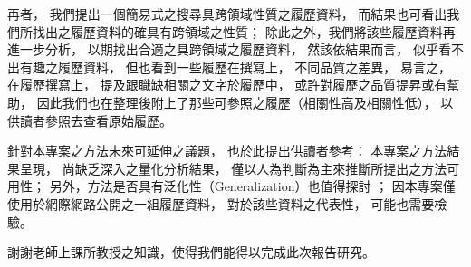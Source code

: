 \documentclass[sigconf]{acmart}
\begin{document}
再者，
我們提出一個簡易式之搜尋具跨領域性質之履歷資料，
而結果也可看出我們所找出之履歷資料的確具有跨領域之性質；
除此之外，我們將該些履歷資料再進一步分析，
以期找出合適之具跨領域之履歷資料，
然該依結果而言，
似乎看不出有趣之履歷資料，
但也看到一些履歷在撰寫上，
不同品質之差異，
易言之，
在履歷撰寫上，
提及跟職缺相關之文字於履歷中，
或許對履歷之品質提昇或有幫助，
因此我們也在整理後附上了那些可參照之履歷（相關性高及相關性低），
以供讀者參照去查看原始履歷。

針對本專案之方法未來可延伸之議題，
也於此提出供讀者參考：
本專案之方法結果呈現，
尚缺乏深入之量化分析結果，
僅以人為判斷為主來推斷所提出之方法可用性；
另外，方法是否具有泛化性（Generalization）也值得探討 \cite{murphy2012machine}；
因本專案僅使用於網際網路公開之一組履歷資料，
對於該些資料之代表性，
可能也需要檢驗。

\begin{acks}
    謝謝老師上課所教授之知識，使得我們能得以完成此次報告研究。
\end{acks}



\end{document}
